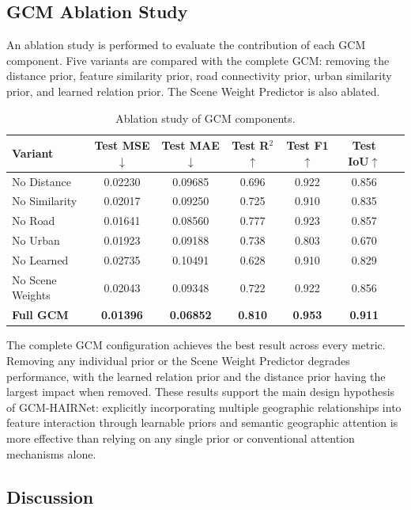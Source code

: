 \documentclass[sigconf, review=true]{acmart}
\begin{document}
\subsection{GCM Ablation Study}

An ablation study is performed to evaluate the contribution of each GCM component. Five variants are compared with the complete GCM: removing the distance prior, feature similarity prior, road connectivity prior, urban similarity prior, and learned relation prior. The Scene Weight Predictor is also ablated.

\begin{table}[t]
  \caption{Ablation study of GCM components.}
  \label{tab:ablation}
  \begin{tabular}{lcccccc}
    \toprule
    \textbf{Variant} & \textbf{Test MSE}$\downarrow$ & \textbf{Test MAE}$\downarrow$ & \textbf{Test R$^2$}$\uparrow$ & \textbf{Test F1}$\uparrow$ & \textbf{Test IoU}$\uparrow$ \\
    \midrule
    No Distance      & 0.02230 & 0.09685 & 0.696 & 0.922 & 0.856 \\
    No Similarity    & 0.02017 & 0.09250 & 0.725 & 0.910 & 0.835 \\
    No Road          & 0.01641 & 0.08560 & 0.777 & 0.923 & 0.857 \\
    No Urban         & 0.01923 & 0.09188 & 0.738 & 0.803 & 0.670 \\
    No Learned       & 0.02735 & 0.10491 & 0.628 & 0.910 & 0.829 \\
    No Scene Weights & 0.02043 & 0.09348 & 0.722 & 0.922 & 0.856 \\
    \textbf{Full GCM} & \textbf{0.01396} & \textbf{0.06852} & \textbf{0.810} & \textbf{0.953} & \textbf{0.911} \\
    \bottomrule
  \end{tabular}
\end{table}

The complete GCM configuration achieves the best result across every metric. Removing any individual prior or the Scene Weight Predictor degrades performance, with the learned relation prior and the distance prior having the largest impact when removed. These results support the main design hypothesis of GCM-HAIRNet: explicitly incorporating multiple geographic relationships into feature interaction through learnable priors and semantic geographic attention is more effective than relying on any single prior or conventional attention mechanisms alone.

\subsection{Discussion}
\end{document}
